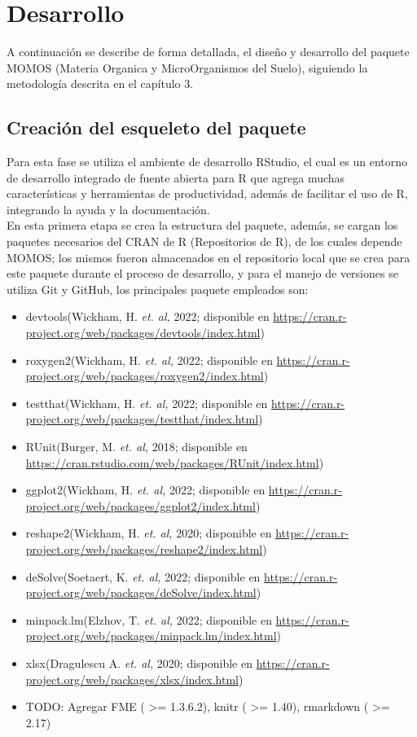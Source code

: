 \chapter{Desarrollo}

A continuaci\'on se describe de forma detallada, el dise\~no y desarrollo del paquete MOMOS (Materia Organica y MicroOrganismos del Suelo), siguiendo la metodolog\'ia descrita en el cap\'itulo 3.

\section{Creación del esqueleto del paquete}

Para esta fase se utiliza el ambiente de desarrollo RStudio, el cual es un entorno de desarrollo integrado de fuente abierta para R que agrega muchas caracter\'isticas y herramientas de productividad, adem\'as de facilitar el uso de R, integrando la ayuda y la documentaci\'on.\\

En esta primera etapa se crea la estructura del paquete, además, se cargan los paquetes necesarios del CRAN de R (Repositorios de R), de los cuales depende MOMOS; los mismos fueron almacenados en el repositorio local que se crea para este paquete durante el proceso de desarrollo, y para el manejo de versiones se utiliza Git y GitHub, los principales paquete empleados son:\\

\begin{itemize}
    \item devtools(Wickham, H. \textit{et. al,} 2022; disponible en \url{https://cran.r-project.org/web/packages/devtools/index.html})
    \item roxygen2(Wickham, H. \textit{et. al,} 2022; disponible en \url{https://cran.r-project.org/web/packages/roxygen2/index.html})
    \item testthat(Wickham, H. \textit{et. al,} 2022; disponible en \url{https://cran.r-project.org/web/packages/testthat/index.html})
    \item RUnit(Burger, M. \textit{et. al,} 2018; disponible en \url{https://cran.rstudio.com/web/packages/RUnit/index.html})
    \item ggplot2(Wickham, H. \textit{et. al,} 2022; disponible en \url{https://cran.r-project.org/web/packages/ggplot2/index.html})
    \item reshape2(Wickham, H. \textit{et. al,} 2020; disponible en \url{https://cran.r-project.org/web/packages/reshape2/index.html})
    \item deSolve(Soetaert, K. \textit{et. al,} 2022; disponible en \url{https://cran.r-project.org/web/packages/deSolve/index.html})
    \item minpack.lm(Elzhov, T. \textit{et. al,} 2022; disponible en \url{https://cran.r-project.org/web/packages/minpack.lm/index.html})
    \item xlsx(Dragulescu A. \textit{et. al,} 2020; disponible en \url{https://cran.r-project.org/web/packages/xlsx/index.html})
    \item TODO: Agregar FME ( >= 1.3.6.2), knitr ( >= 1.40), rmarkdown ( >= 2.17)
\end{itemize}

